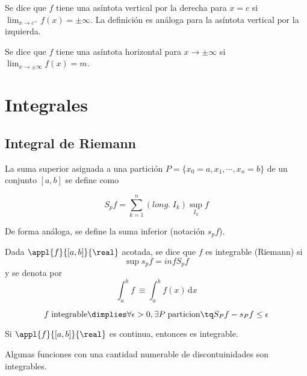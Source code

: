 \documentclass[nochap]{apuntes}
\begin{document}
\begin{defn} Se dice que $f$ tiene una asíntota vertical por la derecha para $x=c$ si $\lim_{x\to c^+}f(x)=\pm \infty$. La definición es análoga para la asíntota vertical por la izquierda.\end{defn}

\begin{defn} Se dice que $f$ tiene una asíntota horizontal para $x\to \pm \infty$ si $\lim_{x\to \pm \infty}f(x)=m$.\end{defn}

\section{Integrales}

\subsection{Integral de Riemann}

\begin{defn}
La suma superior asignada a una partición $P=\{x_0=a, x_1,\cdots, x_n=b\}$ de un conjunto $[a, b]$ se define como

\[ S_pf =\sum_{k=1}^{n}(\textit{long.}\; I_k)\sup_{I_k} f \]

De forma análoga, se define la suma inferior (notación $s_pf$).\end{defn}

\begin{defn}
Dada $\appl{f}{[a,b]}{\real}$ acotada, se dice que $f$ es integrable (Riemann) si
\[ \sup s_pf = inf S_pf \] y se denota por
\[\int^b_a f\ \equiv \int^b_a f(x) \,\mathrm{d}x\]
\end{defn}

\begin{prop} \[ f\; \text{integrable} \dimplies \forall \epsilon >0, \exists P \;\mathrm{ particion} \tq S_Pf-s_Pf \leq \epsilon\]\end{prop}

\begin{prop} Si $\appl{f}{[a,b]}{\real}$ es continua, entonces es integrable.\end{prop}

\begin{remark}
Algunas funciones con una cantidad numerable de discontuinidades son integrables.
\end{remark}
\end{document}
